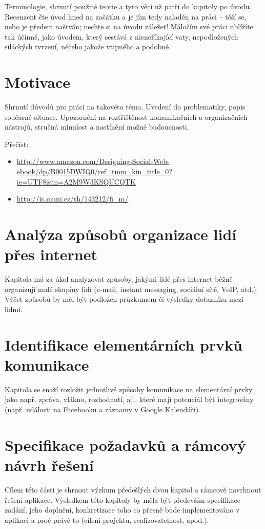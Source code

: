 \documentclass[12pt,oneside,final]{fithesis2}
\begin{document}
Terminologie, shrnutí použité teorie a tyto věci už patří do kapitoly po úvodu. Recenzent čte úvod hned na začátku a je jím tedy naladěn na práci – těší se, nebo je předem naštván; nechte si na úvodu záležet! Máločím své práci ublížíte tak účinně, jako úvodem, který sestává z nicneříkající vaty, nepodložených siláckých tvrzení, něčeho jakože vtipného a podobně.

\chapter{Motivace}
Shrnutí důvodů pro práci na takovéto téma. Uvedení do problematiky, popis současné situace. Upozornění na roztříštěnost komunikačních a organizačních nástrojů, stručná minulost a nastínění možné budoucnosti.

Přečíst:
\begin{itemize}
    \item \url{http://www.amazon.com/Designing-Social-Web-ebook/dp/B0015DWIQ0/ref=tmm_kin_title_0?ie=UTF8&m=A2M9W3KSQUCQTK}
    \item \url{http://is.muni.cz/th/143212/fi_m/}
\end{itemize}

\chapter{Analýza způsobů organizace lidí přes internet}
Kapitola má za úkol analyzovat způsoby, jakými lidé přes internet běžně
organizují malé skupiny lidí (e-mail, instant messaging, sociální sítě,
VoIP, atd.). Výčet způsobů by měl být podložen průzkumem či výsledky dotazníku mezi lidmi.

\chapter{Identifikace elementárních prvků komunikace}
Kapitola se snaží rozložit jednotlivé způsoby komunikace na elementární
prvky jako např. zpráva, vlákno, rozhodnutí, aj., které mají potenciál být
integrovány (např. události na Facebooku a záznamy v Google Kalendáři).

\chapter{Specifikace požadavků a rámcový návrh řešení}
Cílem této části je shrnout výzkum předešlých dvou kapitol a rámcově navrhnout řešení aplikace. Výsledkem této kapitoly by měla být především specifikace zadání, jeho doplnění, konkretizace toho co přesně bude implementováno v aplikaci a proč právě to (cílení projektu, realizovatelnost, apod.).
\end{document}
